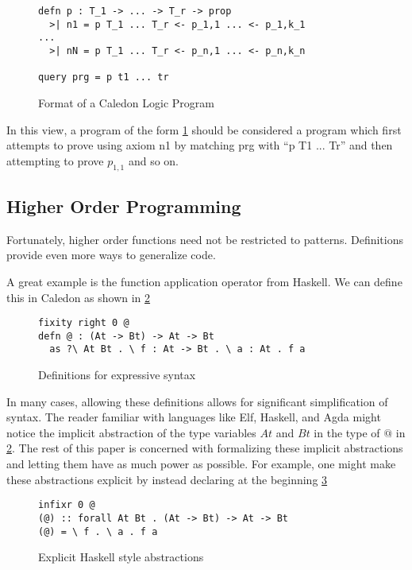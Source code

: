 \begin{figure}[H]
\begin{lstlisting}
defn p : T_1 -> ... -> T_r -> prop
  >| n1 = p T_1 ... T_r <- p_1,1 ... <- p_1,k_1
...
  >| nN = p T_1 ... T_r <- p_n,1 ... <- p_n,k_n

query prg = p t1 ... tr
\end{lstlisting}
\caption{Format of a Caledon Logic Program}
\label{code:format}
\end{figure}

In this view, a program of the form \ref{code:format}
should be considered a program which first attempts to prove using axiom n1 by matching prg with ``p T1 ... Tr'' and then
attempting to prove $p_{1,1}$ and so on.


\FloatBarrier
\subsection{Higher Order Programming}

Fortunately, higher order functions need not be restricted to patterns.  
Definitions provide even more ways to generalize code. 

A great example is the function application operator from Haskell.  
We can define this in Caledon as shown in \ref{code:macros}

\begin{figure}[H]
\begin{lstlisting}
fixity right 0 @
defn @ : (At -> Bt) -> At -> Bt
  as ?\ At Bt . \ f : At -> Bt . \ a : At . f a

\end{lstlisting}
\caption{Definitions for expressive syntax}
\label{code:macros}
\end{figure}

In many cases, allowing these definitions allows for significant simplification of syntax.
The reader familiar with languages like Elf, Haskell, and Agda might notice the 
implicit abstraction of the type variables $At$ and $Bt$ in the type of $@$ in \ref{code:macros}. 
The rest of this paper is concerned with formalizing these implicit abstractions and letting them have
as much power as possible. For example, one might make these abstractions explicit by
instead declaring at the beginning \ref{code:expHask}

\begin{figure}[H]
\begin{lstlisting}
infixr 0 @
(@) :: forall At Bt . (At -> Bt) -> At -> Bt
(@) = \ f . \ a . f a
\end{lstlisting}
\caption{Explicit Haskell style abstractions}
\label{code:expHask}
\end{figure}

